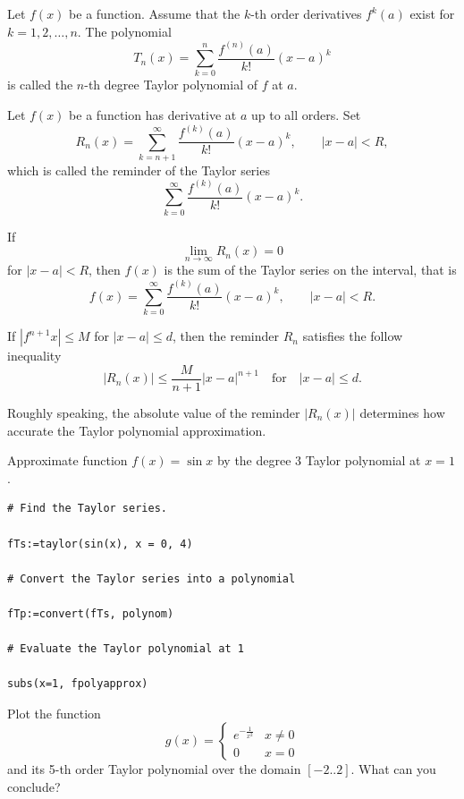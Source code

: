 \documentclass[en,11pt,simple]{elegantbook}
\let\BeginKnitrBlock\begin \let\EndKnitrBlock\end
\begin{document}
Let \(f(x)\) be a function. Assume that the \(k\)-th order derivatives \(f^k(a)\) exist for \(k=1, 2, \dots, n\). The polynomial
\[
T_n(x)=\sum_{k=0}^n\dfrac{f^{(n)}(a)}{k!}(x-a)^k
\]
is called the \(n\)-th degree Taylor polynomial of \(f\) at \(a\).

Let \(f(x)\) be a function has derivative at \(a\) up to all orders. Set
\[
R_n(x)=\sum_{k=n+1}^\infty \dfrac{f^{(k)}(a)}{k!}(x-a)^k,\quad\quad \left|x-a\right|<R,
\]
which is called the reminder of the Taylor series
\[
\sum\limits_{k=0}^\infty \dfrac{f^{(k)}(a)}{k!}(x-a)^k.
\]

If
\[
\lim\limits_{n\to\infty} R_n(x)=0
\]
for \(\left|x-a\right|<R\), then \(f(x)\) is the sum of the Taylor series on the interval, that is
\[
f(x)=\sum\limits_{k=0}^\infty \dfrac{f^{(k)}(a)}{k!}(x-a)^k,\quad\quad \left|x-a\right|<R.
\]

If \(\left|f^{n+1}{x}\right|\leq M\) for \(\left|x-a\right|\leq d\), then the reminder \(R_n\) satisfies the follow inequality
\[
\left|R_n(x)\right|\leq \dfrac{M}{n+1}\left|x-a\right|^{n+1}\quad \text{for}\quad \left|x-a\right|\leq d.
\]

Roughly speaking, the absolute value of the reminder \(\left|R_n(x)\right|\) determines how accurate the Taylor polynomial approximation.

\BeginKnitrBlock{example}{}{}
\protect\hypertarget{exm:unnamed-chunk-236}{}{\label{exm:unnamed-chunk-236} }
Approximate function \(f(x)=\sin x\) by the degree 3 Taylor polynomial at \(x=1\).
\EndKnitrBlock{example}

\BeginKnitrBlock{solution}{}{}
{}

\begin{verbatim}
# Find the Taylor series.

fTs:=taylor(sin(x), x = 0, 4)

# Convert the Taylor series into a polynomial

fTp:=convert(fTs, polynom)

# Evaluate the Taylor polynomial at 1

subs(x=1, fpolyapprox)
\end{verbatim}
\EndKnitrBlock{solution}

\BeginKnitrBlock{example}{}{}
\protect\hypertarget{exm:unnamed-chunk-238}{}{\label{exm:unnamed-chunk-238} }
Plot the function
\[
g(x)=\begin{cases}e^{-\frac{1}{x^2}} & x\neq 0\\ 0 & x=0\end{cases}
\]
and its 5-th order Taylor polynomial over the domain \([-2..2]\). What can you conclude?
\EndKnitrBlock{example}
\end{document}
